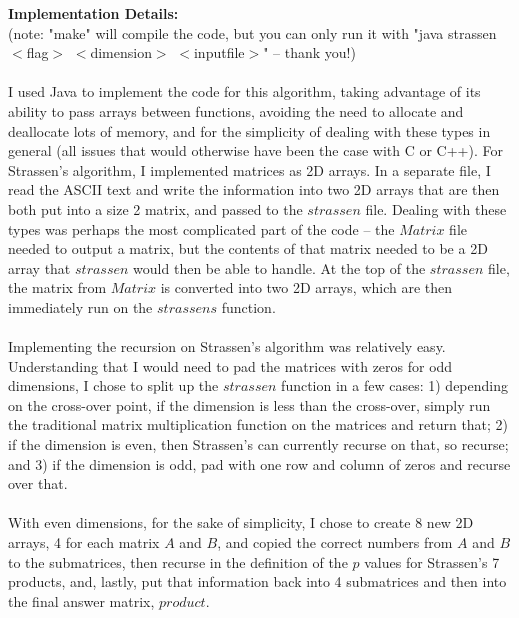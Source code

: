 \documentclass[11pt]{article}
\begin{document}
\textbf{Implementation Details:} \\ (note: "make" will compile the code, but you can only run it with "java strassen $<$flag$>$ $<$dimension$>$ $<$inputfile$>$" -- thank you!)\\\\
I used Java to implement the code for this algorithm, taking advantage of its ability to pass arrays between functions, avoiding the need to allocate and deallocate lots of memory, and for the simplicity of dealing with these types in general (all issues that would otherwise have been the case with C or C++). For Strassen's algorithm, I implemented matrices as 2D arrays. In a separate file, I read the ASCII text and write the information into two 2D arrays that are then both put into a size 2 matrix, and passed to the $strassen$ file. Dealing with these types was perhaps the most complicated part of the code -- the $Matrix$ file needed to output a matrix, but the contents of that matrix needed to be a 2D array that $strassen$ would then be able to handle. At the top of the $strassen$ file, the matrix from $Matrix$ is converted into two 2D arrays, which are then immediately run on the $strassens$ function. \\\\
Implementing the recursion on Strassen's algorithm was relatively easy. Understanding that I would need to pad the matrices with zeros for odd dimensions, I chose to split up the $strassen$ function in a few cases: 1) depending on the cross-over point, if the dimension is less than the cross-over, simply run the traditional matrix multiplication function on the matrices and return that; 2) if the dimension is even, then Strassen's can currently recurse on that, so recurse; and 3) if the dimension is odd, pad with one row and column of zeros and recurse over that. \\\\
With even dimensions, for the sake of simplicity, I chose to create 8 new 2D arrays, 4 for each matrix $A$ and $B$, and copied the correct numbers from $A$ and $B$ to the submatrices, then recurse in the definition of the $p$ values for Strassen's 7 products, and, lastly, put that information back into 4 submatrices and then into the final answer matrix, $product$. \\\\
\end{document}
